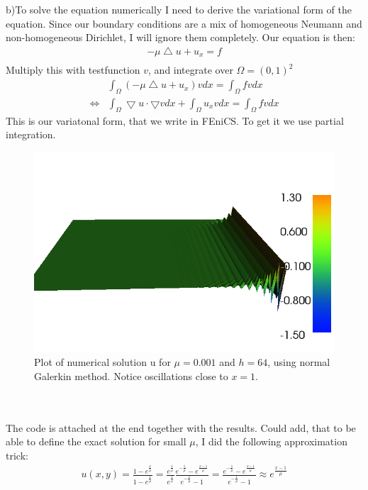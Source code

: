 \documentclass[11pt,a4paper]{report}
\begin{document}
\\
\\
b)To solve the equation numerically I need to derive the variational form of the equation. Since our boundary conditions are a mix of homogeneous Neumann and non-homogeneous Dirichlet, I will ignore them completely. Our equation is then:
\begin{align*}
-\mu\bigtriangleup u +u_x= f \\
\end{align*} 
Multiply this with testfunction $v$, and integrate over $\Omega=(0,1)^2$
\begin{align*}
&\int_{\Omega}(-\mu\bigtriangleup u+u_x)vdx=\int_{\Omega}fvdx \\
\iff &\int_{\Omega}\bigtriangledown u\cdot\bigtriangledown vdx +\int_{\Omega}u_xvdx= \int_{\Omega}fvdx
\end{align*}
This is our variatonal form, that we write in FEniCS. To get it we use partial integration.
\begin{figure}
  \includegraphics[width=\linewidth]{dolfin_plot_2.png}
  \caption{Plot of numerical solution u for $\mu=0.001$ and $h=64$, using normal Galerkin method. Notice oscillations close to $x=1$. }
  \label{Fig 3}
\end{figure}
\\
\\ 
The code is attached at the end together with the results. Could add, that to be able to define the exact solution for small $\mu$, I did the following approximation trick:
\begin{align*}
u(x,y)=\frac{1-e^{\frac{x}{\mu}}}{1-e^{\frac{1}{\mu}}} = \frac{e^{\frac{1}{\mu}}}{e^{\frac{1}{\mu}}}\frac{e^{-\frac{1}{\mu}}-e^{\frac{x-1}{\mu}}}{e^{-\frac{1}{\mu}}-1} = \frac{e^{-\frac{1}{\mu}}-e^{\frac{x-1}{\mu}}}{e^{-\frac{1}{\mu}}-1}  \approx e^{\frac{x-1}{\mu}}
\end{align*} 
\end{document}
